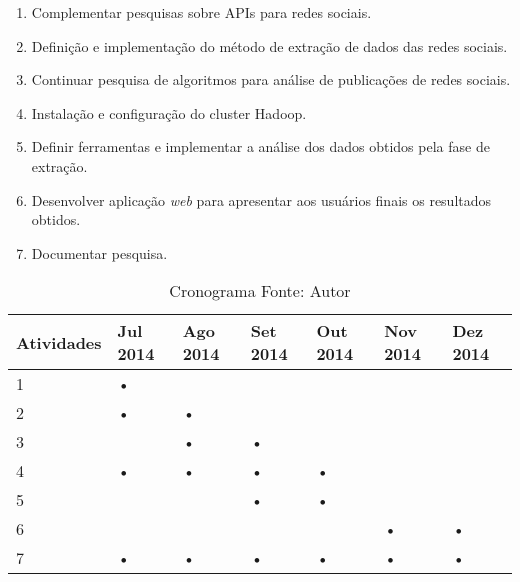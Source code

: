 \begin{enumerate}

  \item Complementar pesquisas sobre APIs para redes sociais.
  \item Definição e implementação do método de extração de dados das redes sociais.
  \item Continuar pesquisa de algoritmos para análise de publicações de redes sociais.
  \item Instalação e configuração do cluster Hadoop.
  \item Definir ferramentas e implementar a análise dos dados obtidos pela fase de extração.
  \item Desenvolver aplicação \textit{web} para apresentar aos usuários finais os resultados obtidos.
  \item Documentar pesquisa.

\end{enumerate}


\begin{table}[!ht]
\begin{center}
  \begin{tabular}{|p{2cm}|p{2cm}|p{2cm}|p{2cm}|p{2cm}|p{2cm}|p{2cm}|}
	\hline
	Atividades & Jul 2014 & Ago 2014 & Set 2014 & Out 2014 & Nov 2014 & Dez 2014
	\\ \hline
	1 & • &   &   &   &   &   	\\ \hline
	2 & • & • &   &   &   &   	\\ \hline
	3 &   & • & • &   &   &   	\\ \hline
	4 & • & • & • & • &   &   	\\ \hline
	5 &   &   & • & • &   &   	\\ \hline
	6 &   &   &   &   & • & •   	\\ \hline
	7 & • & • & • & • & • & •   	\\ \hline
  \end{tabular}
  \captionsetup{justification=centering}
  \caption[Cronograma]{Cronograma
  \protect\linebreak Fonte: Autor}
\label{tab-cron}
\end{center}
\end{table}
\FloatBarrier














